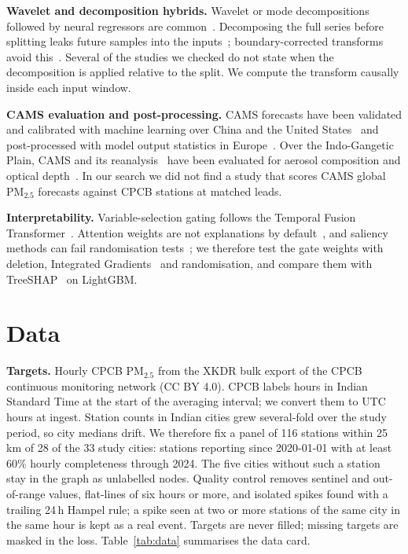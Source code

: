\documentclass[conference]{IEEEtran}
\begin{document}
\textbf{Wavelet and decomposition hybrids.} Wavelet or mode decompositions followed by neural regressors are
common~\cite{Bai_2016,Qiao_2019,Wang_2024,He_2025,Lu_2025b}. Decomposing the full series before splitting leaks future
samples into the inputs~\cite{Quilty_2018}; boundary-corrected transforms avoid this~\cite{Barzegar_2021}. Several of the
studies we checked do not state when the decomposition is applied relative to the split. We compute the transform causally
inside each input window.

\textbf{CAMS evaluation and post-processing.} CAMS forecasts have been validated and calibrated with machine learning over
China and the United States~\cite{Wu_2020} and post-processed with model output statistics in Europe~\cite{Petetin_2022}.
Over the Indo-Gangetic Plain, CAMS and its reanalysis~\cite{Inness_2019} have been evaluated for aerosol composition and
optical depth~\cite{Soni_2021,Ansari_2023,Amarillo_2024}. In our search we did not find a study that scores CAMS global
PM$_{2.5}$ forecasts against CPCB stations at matched leads.

\textbf{Interpretability.} Variable-selection gating follows the Temporal Fusion Transformer~\cite{Lim_2021}. Attention
weights are not explanations by default~\cite{jain2019attention}, and saliency methods can fail randomisation
tests~\cite{adebayo2018sanity}; we therefore test the gate weights with deletion, Integrated
Gradients~\cite{sundararajan2017axiomatic} and randomisation, and compare them with TreeSHAP~\cite{lundberg2017a} on LightGBM.

\section{Data}
\textbf{Targets.} Hourly CPCB PM$_{2.5}$ from the XKDR bulk export of the CPCB continuous monitoring network (CC BY 4.0).
CPCB labels hours in Indian Standard Time at the start of the averaging interval; we convert them to UTC hours at ingest.
Station counts in Indian cities grew several-fold over the study period, so city medians drift. We therefore fix a panel
of 116 stations within 25\,km of 28 of the 33 study cities: stations reporting since 2020-01-01 with at least 60\% hourly
completeness through 2024. The five cities without such a station stay in the graph as unlabelled nodes. Quality
control removes sentinel and out-of-range values, flat-lines of six hours or more, and isolated spikes found with a
trailing 24\,h Hampel rule; a spike seen at two or more stations of the same city in the same hour is kept as a real
event. Targets are never filled; missing targets are masked in the loss. Table~\ref{tab:data} summarises the data card.
\end{document}
